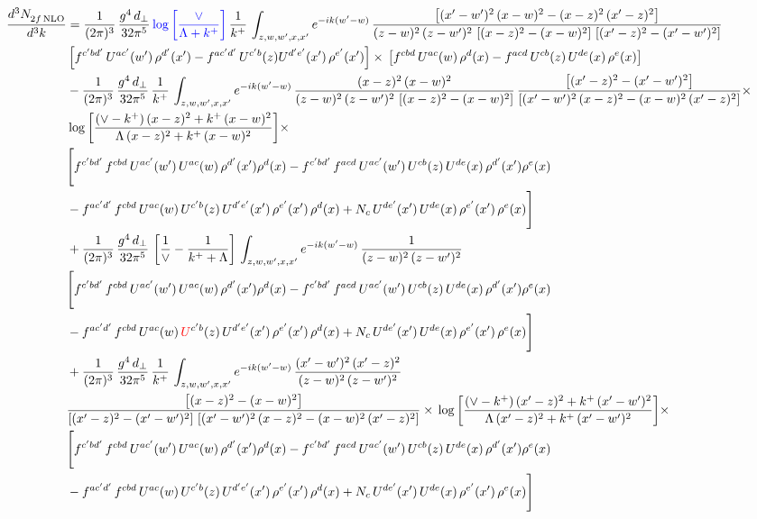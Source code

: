 \documentclass[9pt]{article}
\numberwithin{equation}{section}
\newcommand{\chg}[1]{{\color{red}#1}}
\begin{document}
\begin{align}
    \frac{d^{3}N_{2f\,\rm NLO}^{\rm}}{d^{3}k}  & = \frac{1}{(2\pi)^{3}}\, \frac{g^{4}\,d_{\perp}}{32\pi^{5}}\,{\color{blue}\log{\left[\frac{\vee}{\Lambda + k^{+}}\right]}}\,\frac{1}{k^{+}}\,\int_{z,w,w^{\prime},x,x'} e^{-ik(w^{\prime}-w)}\,\frac{\left[(x'-w')^{2}\, (x-w)^{2} - (x-z)^{2}\, (x'-z)^{2}\right]}{(z-w)^{2}\, (z-w')^{2}\,\left[(x-z)^{2} - (x-w)^{2}\right]\, \left[(x'-z)^{2} - (x'-w')^{2}\right]}\notag \\ &   \left[f^{c'bd'}\, U^{ac'}(w')\,\rho^{d'}(x')-f^{ac'd'}\, U^{c'b}(z)U^{d'e'}(x')\, \rho^{e'}(x')\right]\times\, \left[f^{cbd}\, U^{ac}(w)\,\rho^{d}(x) - f^{acd}\, U^{cb}(z)\,U^{de}(x)\, \rho^{e}(x)\right] \notag \\ & - \frac{1}{(2\pi)^{3}}\, \frac{g^{4}\,d_{\perp}}{32\pi^{5}}\,\frac{1}{k^{+}}\,\int_{z,w,w^{\prime},x,x'} e^{-ik(w^{\prime}-w)}\,\frac{(x-z)^{2}\, (x-w)^{2}}{(z-w)^{2}\, (z-w')^{2}\,\left[(x-z)^{2} - (x-w)^{2}\right]}\,\frac{\left[(x'-z)^{2}-(x'-w')^{2}\right]}{\left[(x'-w')^{2}\, (x-z)^{2} - (x-w)^{2}\, (x'-z)^{2}\right]}\times\notag \\ & \log{\left[\frac{(\vee - k^{+})\, (x-z)^{2} + k^{+}\, (x-w)^{2}}{\Lambda\, (x-z)^{2} + k^{+}\, (x-w)^{2}}\right]}\times\notag \\ & \Bigg[f^{c'bd'}\,f^{cbd}\, U^{ac'}(w')\,U^{ac}(w)\,\rho^{d'}(x')\rho^{d}(x)- f^{c'bd'}\,f^{acd}\,U^{ac'}(w')\,U^{cb}(z)\,U^{de}(x)\,\rho^{d'}(x')\rho^{e}(x) \notag \\ & -f^{ac'd'}\,f^{cbd}\,U^{ac}(w)\,U^{c'b}(z)\,U^{d'e'}(x')\,\rho^{e'}(x')\,\rho^{d}(x) +N_{c}\,U^{de'}(x')\,U^{de}(x)\,\rho^{e'}(x')\,\rho^{e}(x)\Bigg] \notag \\ & + \frac{1}{(2\pi)^{3}}\, \frac{g^{4}\,d_{\perp}}{32\pi^{5}}\,\left[\frac{1}{\vee} - \frac{1}{k^{+} + \Lambda}\right]\,\int_{z,w,w^{\prime},x,x'} e^{-ik(w^{\prime}-w)}\,\frac{1}{(z-w)^{2}\, (z-w')^{2}}\notag \\ & \Bigg[f^{c'bd'}\,f^{cbd}\, U^{ac'}(w')\,U^{ac}(w)\,\rho^{d'}(x')\rho^{d}(x)- f^{c'bd'}\,f^{acd}\,U^{ac'}(w')\,U^{cb}(z)\,U^{de}(x)\,\rho^{d'}(x')\rho^{e}(x) \notag \\ & -f^{ac'd'}\,f^{cbd}\,U^{ac}(w)\,\chg{U}^{c'b}(z)\,U^{d'e'}(x')\,\rho^{e'}(x')\,\rho^{d}(x) +N_{c}\,U^{de'}(x')\,U^{de}(x)\,\rho^{e'}(x')\,\rho^{e}(x)\Bigg] \notag \\ & + \frac{1}{(2\pi)^{3}}\, \frac{g^{4}\,d_{\perp}}{32\pi^{5}}\,\frac{1}{k^{+}}\,\int_{z,w,w^{\prime},x,x'} e^{-ik(w^{\prime}-w)}\,\frac{(x'-w')^{2}\, (x'-z)^{2}}{(z-w)^{2}\, (z-w')^{2}}\notag \\ & \frac{\left[(x-z)^{2} - (x-w)^{2}\right]}{\left[(x'-z)^{2} - (x'-w')^{2}\right]\, \left[(x'-w')^{2}\, (x - z)^{2} - (x-w)^{2}\,(x'-z)^{2}\right]}\times\, \log{\left[\frac{(\vee - k^{+})\, (x'-z)^{2} + k^{+}\, (x'-w')^{2}}{\Lambda\, (x'-z)^{2} + k^{+}\, (x'-w')^{2}}\right]}\times \notag \\ &  \Bigg[f^{c'bd'}\,f^{cbd}\, U^{ac'}(w')\,U^{ac}(w)\,\rho^{d'}(x')\rho^{d}(x)- f^{c'bd'}\,f^{acd}\,U^{ac'}(w')\,U^{cb}(z)\,U^{de}(x)\,\rho^{d'}(x')\rho^{e}(x) \notag \\ & -f^{ac'd'}\,f^{cbd}\,U^{ac}(w)\,U^{c'b}(z)\,U^{d'e'}(x')\,\rho^{e'}(x')\,\rho^{d}(x) +N_{c}\,U^{de'}(x')\,U^{de}(x)\,\rho^{e'}(x')\,\rho^{e}(x)\Bigg]
\end{align}
\end{document}

